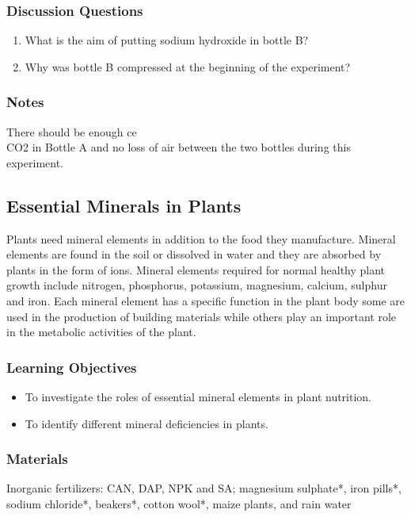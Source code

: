 \subsubsection*{Discussion Questions}
\begin{enumerate}
\item{What is the aim of putting sodium hydroxide in bottle B?}
\item{Why was bottle B compressed at the beginning of the experiment?}
\end{enumerate}

\subsubsection*{Notes}
There should be enough ce\\{CO2} in Bottle A and no loss of air between the two bottles during this experiment.

\subsection{Essential Minerals in Plants}
Plants need mineral elements in addition to the food they manufacture. Mineral elements are found in the soil or dissolved in water and they are absorbed by plants in the form of ions. Mineral elements required for normal healthy plant growth include nitrogen, phosphorus, potassium, magnesium, calcium, sulphur and iron. Each mineral element has a specific function in the plant body some are used in the production of building materials while others play an important role in the metabolic activities of the plant.

\subsubsection*{Learning Objectives}
\begin{itemize}
\item{To investigate the roles of essential mineral elements in plant nutrition.}
\item{To identify different mineral deficiencies in plants.}
\end{itemize}

\subsubsection*{Materials}
Inorganic fertilizers: CAN, DAP, NPK and SA; magnesium sulphate*, iron pills*, sodium chloride*, beakers*, cotton wool*, maize plants, and rain water

